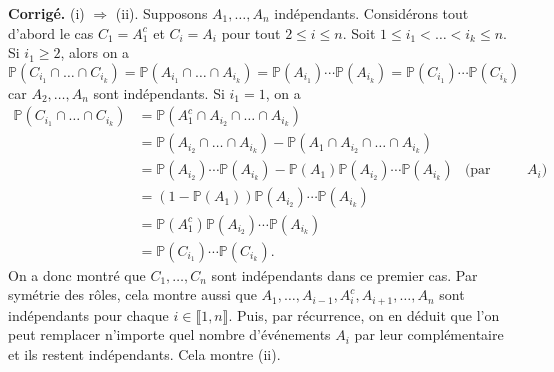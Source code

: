 \documentclass[a4paper,11pt]{article}
\renewcommand{\P}{\mathbb{P}}
\newcommand{\1}{\mathbbm{1}}
\theoremstyle{plain}
\theoremstyle{definition}
\renewenvironment{comment}{\medskip\noindent \textcolor{BrickRed}{\textbf{Corrigé.}}}{}
\begin{document}
\begin{comment}
(i) $\Rightarrow$ (ii). Supposons $A_1,\dots,A_n$ indépendants. 
Considérons tout d'abord le cas $C_1 = A_1^c$ et $C_i = A_i$ pour tout $2 \leq i \leq n$.
Soit $1 \leq i_1 < \dots < i_k \leq n$. 
Si $i_1 \geq 2$, alors on a
\[
\P(C_{i_1} \cap \dots \cap C_{i_k}) 
= \P(A_{i_1} \cap \dots \cap A_{i_k}) 
= \P(A_{i_1}) \cdots \P(A_{i_k})
= \P(C_{i_1}) \cdots \P(C_{i_k})
\]
car $A_2,\dots,A_n$ sont indépendants.
Si $i_1 = 1$, on a 
\begin{align*}
\P(C_{i_1} \cap \dots \cap C_{i_k}) 
& = \P(A_1^c \cap A_{i_2} \cap \dots \cap A_{i_k}) \\
& = \P(A_{i_2} \cap \dots \cap A_{i_k}) - \P(A_1 \cap A_{i_2} \cap \dots \cap A_{i_k}) \\
& = \P(A_{i_2}) \cdots \P(A_{i_k}) - \P(A_1) \P(A_{i_2}) \cdots \P(A_{i_k}) & \text{(par indép. des $A_i$)} \\
& = (1-\P(A_1)) \P(A_{i_2}) \cdots \P(A_{i_k}) \\
& = \P(A_1^c) \P(A_{i_2}) \cdots \P(A_{i_k}) \\
& = \P(C_{i_1}) \cdots \P(C_{i_k}).
\end{align*}
On a donc montré que $C_1,\dots,C_n$ sont indépendants dans ce premier cas.
Par symétrie des rôles, cela montre aussi que $A_1,\dots,A_{i-1},A_i^c,A_{i+1},\dots, A_n$ sont indépendants pour chaque $i \in \llbracket 1,n \rrbracket$.
Puis, par récurrence, on en déduit que l'on peut remplacer n'importe quel nombre d'événements $A_i$ par leur complémentaire et ils restent indépendants. Cela montre (ii).


\end{comment}
\end{document}
